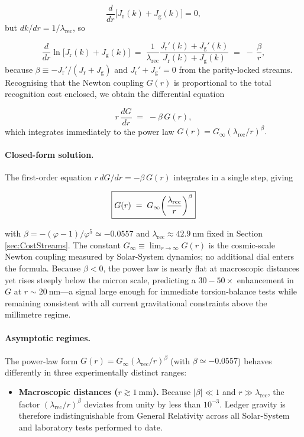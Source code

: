 \documentclass[11pt,oneside]{book}
\begin{document}
{\[
   \frac{d}{dr}\bigl[J_{\mathrm r}(k)+J_{\mathrm g}(k)\bigr]=0,
\]
but \(dk/dr = 1/\lambda_{\text{rec}}\), so

\[
   \frac{d}{dr}\ln\!\bigl[J_{\mathrm r}(k)+J_{\mathrm g}(k)\bigr]
   \;=\;
   \frac{1}{\lambda_{\text{rec}}}
   \frac{J_{\mathrm r}'(k)+J_{\mathrm g}'(k)}
        {J_{\mathrm r}(k)+J_{\mathrm g}(k)}
   \;=\;
   -\,\frac{\beta}{r},
\]
because \(\beta\equiv -J_{\mathrm r}'/(J_{\mathrm r}+J_{\mathrm g})\)
and \(J_{\mathrm r}'+J_{\mathrm g}'=0\) from the parity-locked streams.
Recognising that the Newton coupling \(G(r)\) is proportional to the
total recognition cost enclosed, we obtain the differential equation

\[
   r\,\frac{dG}{dr}\;=\;-\beta\,G(r),
\]
which integrates immediately to the power law
\(
   G(r)=G_{\infty}(\lambda_{\text{rec}}/r)^{\beta}.
\)

\paragraph{Closed-form solution.}
The first-order equation
\(r\,dG/dr=-\beta\,G(r)\) integrates in a single step, giving

\[
   \boxed{%
     G(r)\;=\;
     G_{\infty}\!
     \left(\frac{\lambda_{\text{rec}}}{r}\right)^{\beta}}
\]

with \(\beta=-(\varphi-1)/\varphi^{5}\simeq-0.0557\) and
\(\lambda_{\text{rec}}\approx42.9~\text{nm}\) fixed in
Section \ref{sec:CostStreams}.  The constant
\(G_{\infty}\equiv\lim_{r\to\infty}G(r)\) is the cosmic-scale Newton
coupling measured by Solar-System dynamics; no additional dial enters
the formula.  Because \(\beta<0\), the power law is nearly flat at
macroscopic distances yet rises steeply below the micron scale,
predicting a \(30\!-\!50\times\) enhancement in \(G\) at
\(r\sim20~\text{nm}\)—a signal large enough for immediate torsion-balance
tests while remaining consistent with all current gravitational
constraints above the millimetre regime.

\paragraph{Asymptotic regimes.}
The power-law form
\(G(r)=G_{\infty}(\lambda_{\text{rec}}/r)^{\beta}\)
(with \(\beta\simeq-0.0557\)) behaves differently in three experimentally
distinct ranges:

\begin{itemize}
   \item \textbf{Macroscopic distances (\(r\gtrsim1~\mathrm{mm}\)).}  
         Because \(|\beta|\ll1\) and \(r\gg\lambda_{\text{rec}}\),
         the factor \((\lambda_{\text{rec}}/r)^{\beta}\) deviates from
         unity by less than \(10^{-3}\).  Ledger gravity is therefore
         indistinguishable from General Relativity across all
         Solar-System and laboratory tests performed to date.


\end{itemize}}
\end{document}
